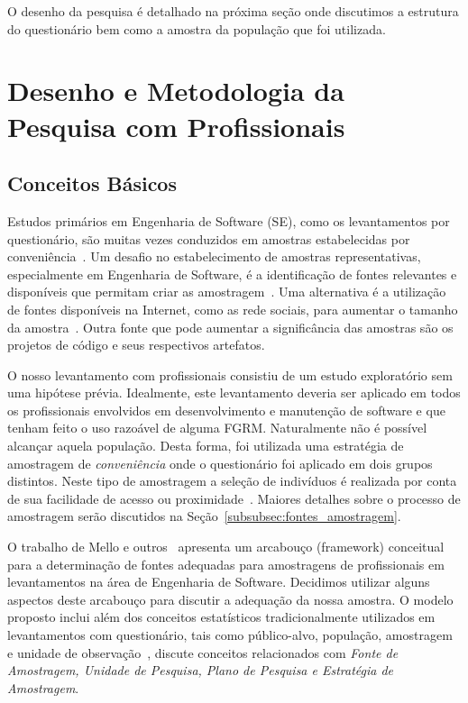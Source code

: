 O desenho da pesquisa é detalhado na próxima seção onde discutimos a estrutura
do questionário bem como a amostra da população que foi utilizada.

\section{Desenho e Metodologia da Pesquisa com Profissionais}
\label{sec:desenho_da_pesquisa_com_profissionais}

\subsection{Conceitos Básicos}

Estudos primários em Engenharia de Software (SE), como os levantamentos por
questionário, são muitas vezes conduzidos em amostras estabelecidas por
conveniência~\cite{sjoberg2005survey, dybaa2006systematic}. Um desafio no
estabelecimento de amostras representativas, especialmente em Engenharia de
Software, é a identificação de fontes relevantes e disponíveis que permitam
criar as amostragem~\cite{de2014towards}. Uma alternativa é a utilização de
fontes disponíveis na Internet, como as rede sociais, para aumentar o tamanho da
amostra~\cite{de2013would}. Outra fonte que pode aumentar a significância das
amostras são os projetos de código e seus respectivos artefatos.

O nosso levantamento com profissionais consistiu de um estudo exploratório sem
uma hipótese prévia. Idealmente, este levantamento deveria ser aplicado em todos
os profissionais envolvidos em desenvolvimento e manutenção de software e que
tenham feito o uso razoável de alguma FGRM. Naturalmente não é possível alcançar
aquela população. Desta forma, foi utilizada uma estratégia de amostragem de
\textit{conveniência} onde o questionário foi aplicado em dois grupos distintos.
Neste tipo de amostragem a seleção de indivíduos é realizada por conta de sua
facilidade de acesso ou proximidade~\cite{marshall1996sampling}. Maiores
detalhes sobre o processo de amostragem serão discutidos na
Seção~\ref{subsubsec:fontes_amostragem}.

O trabalho de Mello e outros~\cite{de2014towards} apresenta um
arcabouço (framework) conceitual para a determinação de fontes adequadas para
amostragens de profissionais em levantamentos na área de Engenharia de Software.
Decidimos utilizar alguns aspectos deste arcabouço para discutir a adequação da
nossa amostra. O modelo proposto inclui além dos conceitos estatísticos
tradicionalmente utilizados em levantamentos com questionário, tais como
público-alvo, população, amostragem e unidade de
observação~\cite{thompson2012sampling}, discute conceitos relacionados com
\textit{Fonte de Amostragem, Unidade de Pesquisa, Plano de Pesquisa e Estratégia
	de Amostragem}.

